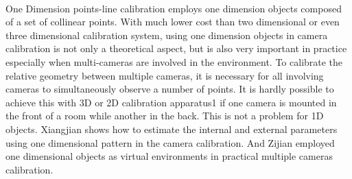 \\\indent
One Dimension points-line calibration employs one dimension objects composed of a set of collinear points. With much lower cost than two dimensional or even three dimensional calibration system, using one dimension objects in camera calibration is not only a theoretical aspect, but is also very important in practice especially when multi-cameras are involved in the environment. To calibrate the relative geometry between multiple cameras, it is necessary for all involving cameras to simultaneously observe a number of points. It is hardly possible to achieve this with 3D or 2D calibration apparatus1 if one camera is mounted in the front of a room while another in the back. This is not a problem for 1D objects. Xiangjian \cite{oneDcalibration1_2006} shows how to estimate the internal and external parameters using one dimensional pattern in the camera calibration. And Zijian \cite{oneDcalibration2_2008} employed one dimensional objects as virtual environments in practical multiple cameras calibration.

